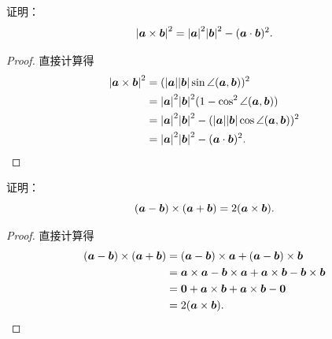 \begin{example}
证明：\begin{equation*}
	\abs{\boldsymbol{a}\times\boldsymbol{b}}^2
	= \abs{\boldsymbol{a}}^2 \abs{\boldsymbol{b}}^2 - (\boldsymbol{a}\cdot\boldsymbol{b})^2.
\end{equation*}
\begin{proof}
\def\t{\angle(\vb{a},\vb{b})}%
直接计算得\begin{align*}
	\abs{\VectorOuterProduct{\vb{a}}{\vb{b}}}^2
	&= (\VectorLengthA{\vb{a}}\VectorLengthA{\vb{b}}\sin\t)^2 \\
	&= \VectorLengthA{\vb{a}}^2 \VectorLengthA{\vb{b}}^2 (1-\cos^2\t) \\
	&= \VectorLengthA{\vb{a}}^2 \VectorLengthA{\vb{b}}^2
	- (\VectorLengthA{\vb{a}}\VectorLengthA{\vb{b}}\cos\t)^2 \\
	&= \VectorLengthA{\vb{a}}^2 \VectorLengthA{\vb{b}}^2
	- (\VectorInnerProductDot{\vb{a}}{\vb{b}})^2.
	\qedhere
\end{align*}
\end{proof}
\end{example}

\begin{example}
证明：\begin{equation*}
	(\boldsymbol{a}-\boldsymbol{b})\times(\boldsymbol{a}+\boldsymbol{b})
	= 2(\boldsymbol{a}\times\boldsymbol{b}).
\end{equation*}
\begin{proof}
直接计算得\begin{align*}
	(\boldsymbol{a}-\boldsymbol{b})\times(\boldsymbol{a}+\boldsymbol{b})
	&= (\boldsymbol{a}-\boldsymbol{b})\times\boldsymbol{a}
		+ (\boldsymbol{a}-\boldsymbol{b})\times\boldsymbol{b} \\
	&= \boldsymbol{a}\times\boldsymbol{a}-\boldsymbol{b}\times\boldsymbol{a}
	+ \boldsymbol{a}\times\boldsymbol{b}-\boldsymbol{b}\times\boldsymbol{b} \\
	&= \boldsymbol{0}+\boldsymbol{a}\times\boldsymbol{b}
	+ \boldsymbol{a}\times\boldsymbol{b}-\boldsymbol{0} \\
	&= 2(\boldsymbol{a}\times\boldsymbol{b}).
	\qedhere
\end{align*}
\end{proof}
\end{example}
